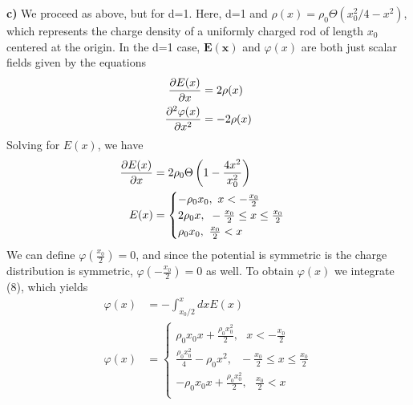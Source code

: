 \documentclass[]{book}
\begin{document}
\textbf{c)} We proceed as above, but for d=1. Here, d=1 and $\rho(x) = \rho_0\Theta(x_0^2/4-x^2)$, which represents the charge density of a uniformly charged rod of length $x_0$ centered at the origin. In the d=1 case, $\textbf{E}(\textbf{x})$ and $\varphi(x)$ are both just scalar fields given by the equations
\begin{equation}
\begin{split}
\pdv{E(x)}{x} &= 2\rho(x)\\
\pdv[2]{\varphi(x)}{x} & = -2\rho(x)\\
\end{split}
\end{equation}
Solving for $E(x)$, we have
\begin{equation}
\begin{split}
\pdv{E(x)}{x} &= 2\rho_0\Theta\left(1 - \frac{4x^2}{x_0^2}\right)\\
E(x) & = \begin{cases}
-\rho_0x_0, \text{ } x< -\frac{x_0}{2} \\
2\rho_0x, \text{ }  -\frac{x_0}{2} \leq x \leq  \frac{x_0}{2} \\
\rho_0x_0, \text{ } \frac{x_0}{2} <x\
\end{cases}
\end{split}
\end{equation}
We can define $\varphi(\frac{x_0}{2})=0$, and since the potential is symmetric is the charge distribution is symmetric, $\varphi(-\frac{x_0}{2})=0$ as well. To obtain $\varphi(x)$ we integrate (8), which yields
\begin{equation}
\begin{split}
\varphi(x) & = -\int_{x_0/2}^{x}dxE(x)\\
\varphi(x) & = 
\begin{cases}
\rho_0x_0x + \frac{\rho_0x_0^2}{2}, \text{ } x< -\frac{x_0}{2} \\
\frac{\rho_0x_0^2}{4}-\rho_0x^2, \text{ } -\frac{x_0}{2} \leq x \leq  \frac{x_0}{2} \\
-\rho_0x_0x + \frac{\rho_0x_0^2}{2}, \text{ } \frac{x_0}{2}<x \\
\end{cases}
\end{split}
\end{equation}
\end{document}

